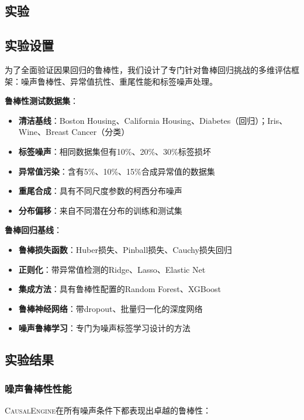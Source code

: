 \documentclass[conference]{IEEEtran}
\newcommand{\causalengine}{\textsc{CausalEngine}}
\begin{document}
\begin{CJK}{UTF8}{gbsn}
\section{实验}
\label{sec:experiments}

\subsection{实验设置}

为了全面验证因果回归的鲁棒性，我们设计了专门针对鲁棒回归挑战的多维评估框架：噪声鲁棒性、异常值抗性、重尾性能和标签噪声处理。

\textbf{鲁棒性测试数据集}：
\begin{itemize}
\item \textbf{清洁基线}：Boston Housing、California Housing、Diabetes（回归）；Iris、Wine、Breast Cancer（分类）
\item \textbf{标签噪声}：相同数据集但有10\%、20\%、30\%标签损坏
\item \textbf{异常值污染}：含有5\%、10\%、15\%合成异常值的数据集
\item \textbf{重尾合成}：具有不同尺度参数的柯西分布噪声
\item \textbf{分布偏移}：来自不同潜在分布的训练和测试集
\end{itemize}

\textbf{鲁棒回归基线}：
\begin{itemize}
\item \textbf{鲁棒损失函数}：Huber损失、Pinball损失、Cauchy损失回归
\item \textbf{正则化}：带异常值检测的Ridge、Lasso、Elastic Net
\item \textbf{集成方法}：具有鲁棒性配置的Random Forest、XGBoost
\item \textbf{鲁棒神经网络}：带dropout、批量归一化的深度网络
\item \textbf{噪声鲁棒学习}：专门为噪声标签学习设计的方法
\end{itemize}

\subsection{实验结果}

\subsubsection{噪声鲁棒性性能}

\causalengine{}在所有噪声条件下都表现出卓越的鲁棒性：


\end{CJK}
\end{document}
